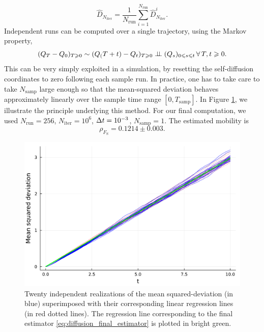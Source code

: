     \begin{equation}
        \label{eq:diffusion_final_estimator}
        \widehat{D}_{N_{\mathrm{iter}}}=\frac{1}{N_{\mathrm{run}}}\sum_{i=1}^{N_{\mathrm{run}}}\widehat{D}^i_{N_{\mathrm{iter}}}.
    \end{equation}
    Independent runs can be computed over a single trajectory, using the Markov property,
    \[(Q_T-Q_0)_{T\geqslant 0} \sim (Q_(T+t)-Q_t)_{T\geqslant 0} \mathrel{\perp\!\!\!\perp} (Q_s)_{0\leqslant s\leqslant t}\,\forall\,T,t\geqslant 0.\]
    This can be very simply exploited in a simulation, by resetting the self-diffusion coordinates to zero following each sample run. 
    In practice, one has to take care to take $N_{\mathrm{samp}}$ large enough so that the mean-squared deviation behaves approximately linearly over the sample time range $[0,T_{\mathrm{samp}}]$.
    In Figure \ref{fig:einstein_demo}, we illustrate the principle underlying this method. 
    For our final computation, we used $N_{\mathrm{run}}=256$, $N_{\mathrm{iter}}=10^6$, ${\Delta t}=10^{-3}$, $N_{\mathrm{samp}}=1$.
    The estimated mobility is 
    \begin{equation}
        \label{eq:einstein_est_mobility}
        \rho_{F_{\mathrm{S}}}=0.1214\pm 0.003.
    \end{equation}

\begin{figure}[htbp]
    \begin{center}
      \includegraphics[width=0.8\linewidth]{figures/einstein_demo.pdf}
      \caption{ \label{fig:einstein_demo}
        Twenty independent realizations of the mean squared-deviation (in blue) superimposed with their corresponding linear regression lines (in red dotted lines).
        The regression line corresponding to the final estimator \eqref{eq:diffusion_final_estimator} is plotted in bright green.
      }
    \end{center}
  \end{figure}
